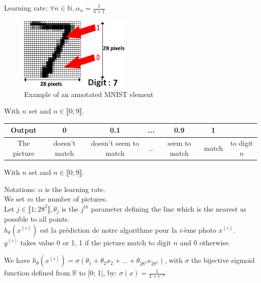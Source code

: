 \documentclass{beamer}
\begin{document}
	\newpage
	
	\vspace*{\fill}
	Learning rate:
\LARGE$\forall n \in \mathbb{N}, \alpha_n = \frac{1}{n + 1}$
\vspace*{\fill}

\newpage

\begin{figure}
	\centering
			\includegraphics[width=150pt]{pictures/mnistEN.png}
		\caption{Example of an annotated MNIST element}
	\end{figure}
	
\normalsize With $n$ set and $n \in \llbracket 0; 9\rrbracket$.
{\fontsize{6}{7}\selectfont
\begin{center}
	\begin{tabular}{ |c||c|c|c|c|c|c| } 
	 \hline
	 Output & 0 & 0.1 & ... & 0.9 & 1 &\\ 
	\hline
	 The picture & doesn't match & doesn't seem to match & ... & seem to match & match & to digit $n$\\
	 \hline
	\end{tabular}
\end{center}}

	\newpage
	
	\normalsize
	With $n$ set and $n \in \llbracket 0; 9\rrbracket$.
	
	\vspace{0.3cm}Notations: $\alpha$ is the learning rate.\\
	We set $m$ the number of pictures.\\
	Let $j \in \llbracket 1; 28^2 \rrbracket, \theta_j$ is the $j^{th}$ parameter defining the line which is the nearest as possible to all points.\\
	$h_\theta(x^{(i)})$ est la prédiction de notre algorithme pour la $i$-ème photo $x^{(i)}$.\\
	$y^{(i)}$ takes value 0 or 1, 1 if the picture match to digit $n$ and 0 otherwise.
	
	\vspace{0.3cm}We have $h_\theta(x^{(i)}) = \sigma(\theta_1 + \theta_2 x_2 + ... + \theta_{28^2} x_{28^2})$, with $\sigma$ the bijective sigmoid function defined from $\mathbb{R}$ to [0; 1], by: $\sigma(x) = \frac{1}{1 + e^{-x}}$
	
\end{document}
